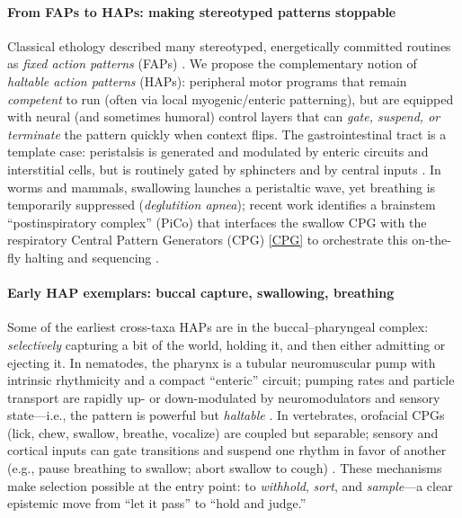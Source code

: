 \paragraph{From FAPs to HAPs: making stereotyped patterns stoppable}
Classical ethology described many stereotyped, energetically committed routines as \emph{fixed action patterns} (FAPs) \citep{Ronacher2019FAP}. We propose the complementary notion of \emph{haltable action patterns} (HAPs): peripheral motor programs that remain \emph{competent} to run (often via local myogenic/enteric patterning), but are equipped with neural (and sometimes humoral) control layers that can \emph{gate, suspend, or terminate} the pattern quickly when context flips. The gastrointestinal tract is a template case: peristalsis is generated and modulated by enteric circuits and interstitial cells, but is routinely gated by sphincters and by central inputs \citep{Sharkey2022ENS}. In worms and mammals, swallowing launches a peristaltic wave, yet breathing is temporarily suppressed (\emph{deglutition apnea}); recent work identifies a brainstem “postinspiratory complex” (PiCo) that interfaces the swallow CPG with the respiratory Central Pattern Generators (CPG) \ref{CPG} to orchestrate this on-the-fly halting and sequencing \citep{Matsuo2009Coordination,Barlow2009CPGOralResp,Moore2014BrainstemOrofacial,Huff2023PiCo}. 

\paragraph{Early HAP exemplars: buccal capture, swallowing, breathing}
Some of the earliest cross-taxa HAPs are in the buccal–pharyngeal complex: \emph{selectively} capturing a bit of the world, holding it, and then either admitting or ejecting it. In nematodes, the pharynx is a tubular neuromuscular pump with intrinsic rhythmicity and a compact “enteric” circuit; pumping rates and particle transport are rapidly up- or down-modulated by neuromodulators and sensory state—i.e., the pattern is powerful but \emph{haltable} \citep{Avery2012CelegansFeeding,Trojanowski2016PharyngealPumping}. In vertebrates, orofacial CPGs (lick, chew, swallow, breathe, vocalize) are coupled but separable; sensory and cortical inputs can gate transitions and suspend one rhythm in favor of another (e.g., pause breathing to swallow; abort swallow to cough) \citep{Moore2014BrainstemOrofacial,Matsuo2009Coordination,Huff2023PiCo}. These mechanisms make selection possible at the entry point: to \emph{withhold}, \emph{sort}, and \emph{sample}—a clear epistemic move from “let it pass” to “hold and judge.” 

